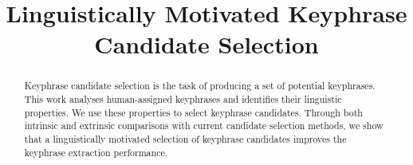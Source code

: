 \documentclass[11pt,letterpaper]{article}
\title{
    Linguistically Motivated Keyphrase Candidate Selection
}
\date{}
\begin{document}
    \maketitle
    
    \begin{abstract}
        Keyphrase candidate selection is the task of producing a set of potential keyphrases.
        This work analyses human-assigned keyphrases and identifies their linguistic properties.
        We use these properties to select keyphrase candidates.
        Through both intrinsic and extrinsic comparisons with current candidate selection methods, we show that a
        linguistically motivated selection of keyphrase candidates improves the keyphrase extraction performance.
    \end{abstract}
    
    
    
    
    
    
    
    
    
    
    
    
\end{document}
